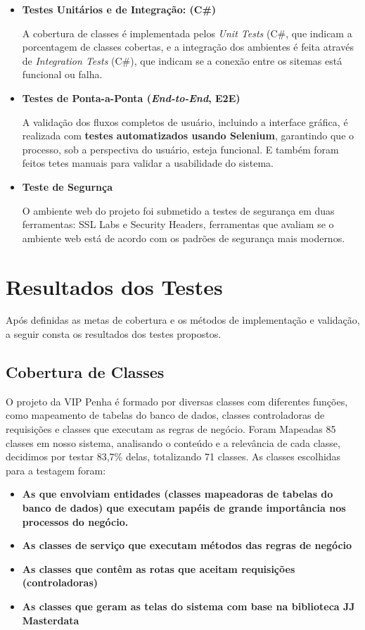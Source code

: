 \documentclass[
	12pt,				%
	openany,			%
	twoside,			%
	a4paper,			%
	english,			%
	brazil				%
	]{abntex2}
\begin{document}
\begin{itemize}
    \item \textbf{Testes Unitários e de Integração:  (C\#)}
 
        A cobertura de classes é implementada pelos \textit{Unit Tests} (C\#, que indicam a porcentagem de classes cobertas, e a integração dos ambientes é feita através de \textit{Integration Tests} (C\#), que indicam se a conexão entre os sitemas está funcional ou falha.

    \item \textbf{Testes de Ponta-a-Ponta (\textit{End-to-End}, E2E)}

        A validação dos fluxos completos de usuário, incluindo a interface gráfica, é realizada com \textbf{testes automatizados usando Selenium}, garantindo que o processo, sob a perspectiva do usuário, esteja funcional. E também foram feitos tetes manuais para validar a usabilidade do sistema.


    \item \textbf{Teste de Segurnça}

        O ambiente web do projeto foi submetido a testes de segurança em duas ferramentas: SSL Labs e Security Headers, ferramentas que avaliam se o ambiente web está de acordo com os padrões de segurança mais modernos.
\end{itemize}



\section{Resultados dos Testes}

Após definidas as metas de cobertura e os métodos de implementação e validação, a seguir consta os resultados dos testes propostos.

\subsection{Cobertura de Classes}

O projeto da VIP Penha é formado por diversas classes com diferentes funções, como mapeamento de tabelas do banco de dados, classes controladoras de requisições e classes que executam as regras de negócio.
Foram Mapeadas 85 classes em nosso sistema, analisando o conteúdo e a relevância de cada classe, decidimos por testar 83,7\% delas, totalizando 71 classes. 
As classes escolhidas para a testagem foram:
\begin{itemize}
\item \textbf{As que envolviam entidades (classes mapeadoras de tabelas do banco de dados) que executam papéis de grande importância nos processos do negócio.}
\item \textbf{As classes de serviço que executam métodos das regras de negócio}
\item \textbf{As classes que contêm as rotas que aceitam requisições (controladoras)}
\item \textbf{As classes que geram as telas do sistema com base na biblioteca JJ Masterdata}
\end{itemize}
\end{document}
